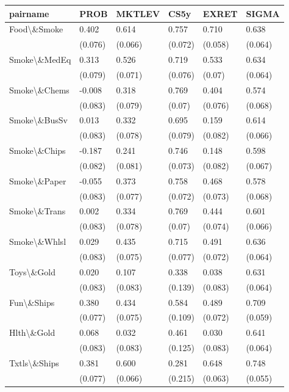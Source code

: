 
\begin{tabular}{l|l|l|l|l|l}
\hline
pairname & PROB & MKTLEV & CS5y & EXRET & SIGMA\\
\hline
Food\textbackslash{}\&Smoke & 0.402 & 0.614 & 0.757 & 0.710 & 0.638\\
 & (0.076) & (0.066) & (0.072) & (0.058) & (0.064)\\
Smoke\textbackslash{}\&MedEq & 0.313 & 0.526 & 0.719 & 0.533 & 0.634\\
 & (0.079) & (0.071) & (0.076) & (0.07) & (0.064)\\
Smoke\textbackslash{}\&Chems & -0.008 & 0.318 & 0.769 & 0.404 & 0.574\\
 & (0.083) & (0.079) & (0.07) & (0.076) & (0.068)\\
Smoke\textbackslash{}\&BusSv & 0.013 & 0.332 & 0.695 & 0.159 & 0.614\\
 & (0.083) & (0.078) & (0.079) & (0.082) & (0.066)\\
Smoke\textbackslash{}\&Chips & -0.187 & 0.241 & 0.746 & 0.148 & 0.598\\
 & (0.082) & (0.081) & (0.073) & (0.082) & (0.067)\\
Smoke\textbackslash{}\&Paper & -0.055 & 0.373 & 0.758 & 0.468 & 0.578\\
 & (0.083) & (0.077) & (0.072) & (0.073) & (0.068)\\
Smoke\textbackslash{}\&Trans & 0.002 & 0.334 & 0.769 & 0.444 & 0.601\\
 & (0.083) & (0.078) & (0.07) & (0.074) & (0.066)\\
Smoke\textbackslash{}\&Whlsl & 0.029 & 0.435 & 0.715 & 0.491 & 0.636\\
 & (0.083) & (0.075) & (0.077) & (0.072) & (0.064)\\
Toys\textbackslash{}\&Gold & 0.020 & 0.107 & 0.338 & 0.038 & 0.631\\
 & (0.083) & (0.083) & (0.139) & (0.083) & (0.064)\\
Fun\textbackslash{}\&Ships & 0.380 & 0.434 & 0.584 & 0.489 & 0.709\\
 & (0.077) & (0.075) & (0.109) & (0.072) & (0.059)\\
Hlth\textbackslash{}\&Gold & 0.068 & 0.032 & 0.461 & 0.030 & 0.641\\
 & (0.083) & (0.083) & (0.125) & (0.083) & (0.064)\\
Txtls\textbackslash{}\&Ships & 0.381 & 0.600 & 0.281 & 0.648 & 0.748\\
 & (0.077) & (0.066) & (0.215) & (0.063) & (0.055)\\

\end{tabular}
